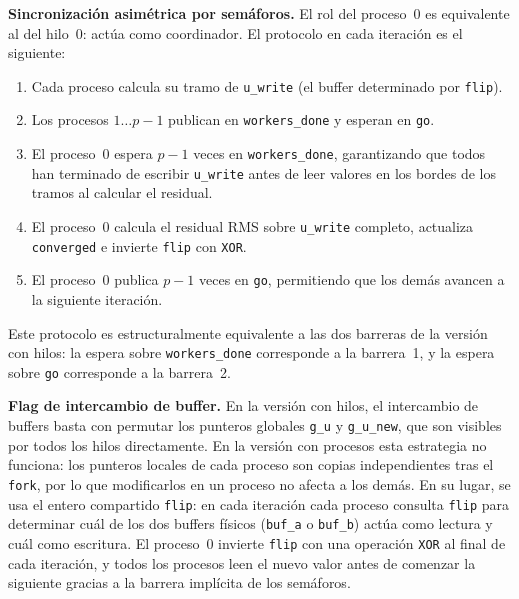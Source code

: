 \textbf{Sincronización asimétrica por semáforos.} El rol del proceso~0 es equivalente al del hilo~0: actúa como coordinador. El protocolo en cada iteración es el siguiente:

\begin{enumerate}
    \item Cada proceso calcula su tramo de \texttt{u\_write} (el buffer determinado por \texttt{flip}).
    \item Los procesos $1 \ldots p{-}1$ publican en \texttt{workers\_done} y esperan en \texttt{go}.
    \item El proceso~0 espera $p{-}1$ veces en \texttt{workers\_done}, garantizando que todos han terminado de escribir \texttt{u\_write} antes de leer valores en los bordes de los tramos al calcular el residual.
    \item El proceso~0 calcula el residual RMS sobre \texttt{u\_write} completo, actualiza \texttt{converged} e invierte \texttt{flip} con \texttt{XOR}.
    \item El proceso~0 publica $p{-}1$ veces en \texttt{go}, permitiendo que los demás avancen a la siguiente iteración.
\end{enumerate}

Este protocolo es estructuralmente equivalente a las dos barreras de la versión con hilos: la espera sobre \texttt{workers\_done} corresponde a la barrera~1, y la espera sobre \texttt{go} corresponde a la barrera~2.

\textbf{Flag de intercambio de buffer.} En la versión con hilos, el intercambio de buffers basta con permutar los punteros globales \texttt{g\_u} y \texttt{g\_u\_new}, que son visibles por todos los hilos directamente. En la versión con procesos esta estrategia no funciona: los punteros locales de cada proceso son copias independientes tras el \texttt{fork}, por lo que modificarlos en un proceso no afecta a los demás. En su lugar, se usa el entero compartido \texttt{flip}: en cada iteración cada proceso consulta \texttt{flip} para determinar cuál de los dos buffers físicos (\texttt{buf\_a} o \texttt{buf\_b}) actúa como lectura y cuál como escritura. El proceso~0 invierte \texttt{flip} con una operación \texttt{XOR} al final de cada iteración, y todos los procesos leen el nuevo valor antes de comenzar la siguiente gracias a la barrera implícita de los semáforos.